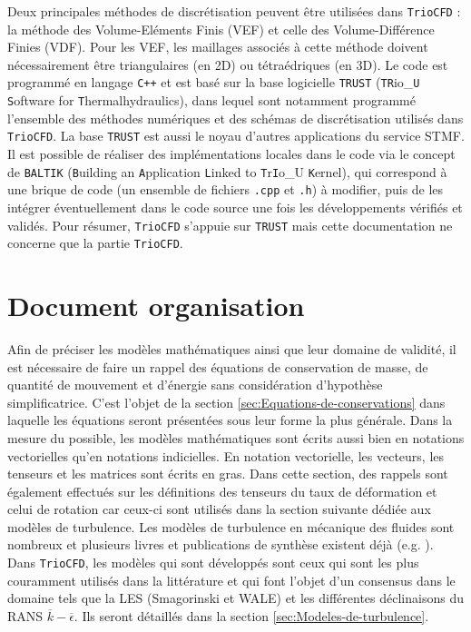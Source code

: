 Deux principales m\'ethodes de discr\'etisation peuvent \^etre utilis\'ees
dans \texttt{TrioCFD} : la m\'ethode des Volume-El\'ements Finis (VEF)
et celle des Volume-Diff\'erence Finies (VDF). Pour les VEF, les maillages
associ\'es \`a cette m\'ethode doivent n\'ecessairement \^etre triangulaires
(en 2D) ou t\'etra\'edriques (en 3D). Le code est programm\'e en langage
\texttt{C++} et est bas\'e sur la base logicielle \texttt{TRUST} (\texttt{TR}io\_\texttt{U}
\texttt{S}oftware for \texttt{T}hermalhydraulics), dans lequel sont
notamment programm\'e l\textquoteright ensemble des m\'ethodes num\'eriques
et des sch\'emas de discr\'etisation utilis\'es dans \texttt{TrioCFD}. La
base \texttt{TRUST} est aussi le noyau d'autres applications du service
STMF. Il est possible de r\'ealiser des impl\'ementations locales dans
le code via le concept de \texttt{BALTIK} (\texttt{B}uilding an \texttt{A}pplication
\texttt{L}inked to \texttt{T}r\texttt{I}o\_U \texttt{K}ernel), qui
correspond \`a une brique de code (un ensemble de fichiers \texttt{.cpp}
et \texttt{.h}) \`a modifier, puis de les int\'egrer \'eventuellement dans
le code source une fois les d\'eveloppements v\'erifi\'es et valid\'es. Pour
r\'esumer, \texttt{TrioCFD} s'appuie sur \texttt{TRUST} mais cette documentation
ne concerne que la partie \texttt{TrioCFD}.



\chapter{Document organisation}

Afin de pr\'eciser les mod\`eles math\'ematiques ainsi que leur domaine
de validit\'e, il est n\'ecessaire de faire un rappel des \'equations de
conservation de masse, de quantit\'e de mouvement et d'\'energie sans
consid\'eration d'hypoth\`ese simplificatrice. C'est l'objet de la section
\ref{sec:Equations-de-conservations} dans laquelle les \'equations
seront pr\'esent\'ees sous leur forme la plus g\'en\'erale. Dans la mesure
du possible, les mod\`eles math\'ematiques sont \'ecrits aussi bien en notations
vectorielles qu'en notations indicielles. En notation vectorielle,
les vecteurs, les tenseurs et les matrices sont \'ecrits en gras. Dans
cette section, des rappels sont \'egalement effectu\'es sur les d\'efinitions
des tenseurs du taux de d\'eformation et celui de rotation car ceux-ci
sont utilis\'es dans la section suivante d\'edi\'ee aux mod\`eles de turbulence.
Les mod\`eles de turbulence en m\'ecanique des fluides sont nombreux et
plusieurs livres et publications de synth\`ese existent d\'ej\`a
(e.g. \cite{Book_Chassaing,Argyropoulos-Markatos_ReviewTurbulence_AMM2015}).
Dans \texttt{TrioCFD}, les mod\`eles qui sont d\'evelopp\'es sont ceux qui
sont les plus couramment utilis\'es dans la litt\'erature et qui font
l'objet d'un consensus dans le domaine tels que la LES (Smagorinski
et WALE) et les diff\'erentes d\'eclinaisons du RANS $\overline{k}-\overline{\epsilon}$.
Ils seront d\'etaill\'es dans la section \ref{sec:Modeles-de-turbulence}.\\

